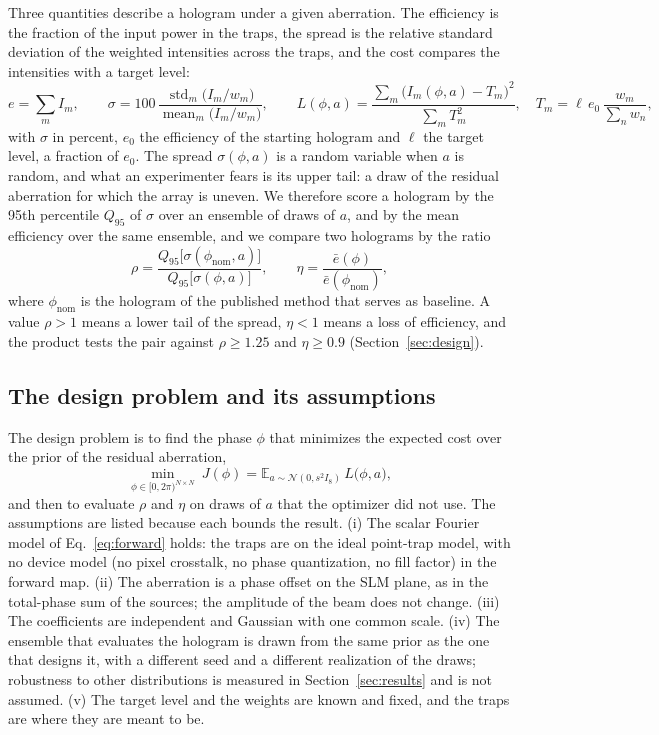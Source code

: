 Three quantities describe a hologram under a given aberration. The efficiency is the fraction of the input power in the traps, the spread is the relative standard deviation of the weighted intensities across the traps, and the cost compares the intensities with a target level:
\begin{equation}
e=\sum_mI_m,\qquad \sigma=100\,\frac{\operatorname{std}_m\!\big(I_m/w_m\big)}{\operatorname{mean}_m\!\big(I_m/w_m\big)},\qquad L(\phi,a)=\frac{\sum_m\big(I_m(\phi,a)-T_m\big)^2}{\sum_mT_m^2},\quad T_m=\ell\,e_0\,\frac{w_m}{\sum_nw_n},\label{eq:metrics}
\end{equation}
with $\sigma$ in percent, $e_0$ the efficiency of the starting hologram and $\ell$ the target level, a fraction of $e_0$. The spread $\sigma(\phi,a)$ is a random variable when $a$ is random, and what an experimenter fears is its upper tail: a draw of the residual aberration for which the array is uneven.
We therefore score a hologram by the 95th percentile $Q_{95}$ of $\sigma$ over an ensemble of draws of $a$, and by the mean efficiency over the same ensemble, and we compare two holograms by the ratio
\begin{equation}
\rho=\frac{Q_{95}\big[\sigma(\phi_{\mathrm{nom}},a)\big]}{Q_{95}\big[\sigma(\phi,a)\big]},\qquad \eta=\frac{\bar e(\phi)}{\bar e(\phi_{\mathrm{nom}})},\label{eq:ratios}
\end{equation}
where $\phi_{\mathrm{nom}}$ is the hologram of the published method that serves as baseline. A value $\rho>1$ means a lower tail of the spread, $\eta<1$ means a loss of efficiency, and the product tests the pair against $\rho\ge1.25$ and $\eta\ge0.9$ (Section~\ref{sec:design}).

\subsection{The design problem and its assumptions}

The design problem is to find the phase $\phi$ that minimizes the expected cost over the prior of the residual aberration,
\begin{equation}
\min_{\phi\in[0,2\pi)^{N\times N}}\ J(\phi)=\mathbb E_{a\sim\mathcal N(0,s^2I_8)}\,L\big(\phi,a\big),\label{eq:problem}
\end{equation}
and then to evaluate $\rho$ and $\eta$ on draws of $a$ that the optimizer did not use. The assumptions are listed because each bounds the result. (i) The scalar Fourier model of Eq.~\eqref{eq:forward} holds: the traps are on the ideal point-trap model, with no device model (no
pixel crosstalk, no phase quantization, no fill factor) in the forward map. (ii) The aberration is a phase offset on the SLM plane, as in the total-phase sum of the sources; the amplitude of the beam does not change. (iii) The coefficients are independent and Gaussian with one common scale. (iv) The ensemble that evaluates the hologram is drawn
from the same prior as the one that designs it, with a different seed and a different realization of the draws; robustness to other distributions is measured in Section~\ref{sec:results} and is not assumed. (v) The target level and the weights are known and fixed, and the traps are where they are meant to be.

